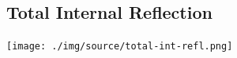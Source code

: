 \begin{multicols}{2}
\columnbreak

%
%

\subsection{Total Internal Reflection}

\begin{center}
\texttt{[image: ./img/source/total-int-refl.png]}
\end{center}


\end{multicols}
